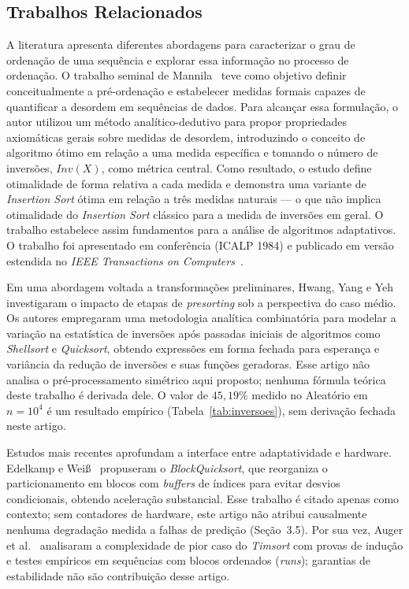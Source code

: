 \documentclass[portuguese]{sbc2025}%
\begin{document}
\subsection{Trabalhos Relacionados}

A literatura apresenta diferentes abordagens para caracterizar o grau de ordenação de uma sequência e explorar essa informação no processo de ordenação. O trabalho seminal de Mannila~\citep{mannila_measures_1984} teve como objetivo definir conceitualmente a pré-ordenação e estabelecer medidas formais capazes de quantificar a desordem em sequências de dados. Para alcançar essa formulação, o autor utilizou um método analítico-dedutivo para propor propriedades axiomáticas gerais sobre medidas de desordem, introduzindo o conceito de algoritmo ótimo em relação a uma medida específica e tomando o número de inversões, $Inv(X)$, como métrica central. Como resultado, o estudo define otimalidade de forma relativa a cada medida e demonstra uma variante de \emph{Insertion Sort} ótima em relação a três medidas naturais — o que não implica otimalidade do \emph{Insertion Sort} clássico para a medida de inversões em geral. O trabalho estabelece assim fundamentos para a análise de algoritmos adaptativos. O trabalho foi apresentado em conferência (ICALP 1984) e publicado em versão estendida no \emph{IEEE Transactions on Computers}~\citep{mannila_measures_1984}.

Em uma abordagem voltada a transformações preliminares, Hwang, Yang e Yeh~\citep{hwang_presorting_2000} investigaram o impacto de etapas de \emph{presorting} sob a perspectiva do caso médio. Os autores empregaram uma metodologia analítica combinatória para modelar a variação na estatística de inversões após passadas iniciais de algoritmos como \emph{Shellsort} e \emph{Quicksort}, obtendo expressões em forma fechada para esperança e variância da redução de inversões e suas funções geradoras. Esse artigo não analisa o pré-processamento simétrico aqui proposto; nenhuma fórmula teórica deste trabalho é derivada dele. O valor de $45{,}19\%$ medido no Aleatório em $n{=}10^4$ é um resultado empírico (Tabela~\ref{tab:inversoes}), sem derivação fechada neste artigo.

Estudos mais recentes aprofundam a interface entre adaptatividade e hardware. Edelkamp e Wei{\ss}~\citep{edelkamp_blockquicksort_2016} propuseram o \emph{BlockQuicksort}, que reorganiza o particionamento em blocos com \emph{buffers} de índices para evitar desvios condicionais, obtendo aceleração substancial. Esse trabalho é citado apenas como contexto; sem contadores de hardware, este artigo não atribui causalmente nenhuma degradação medida a falhas de predição (Seção~3.5). Por sua vez, Auger et al.~\citep{auger_timsort_2018} analisaram a complexidade de pior caso do \emph{Timsort} com provas de indução e testes empíricos em sequências com blocos ordenados (\emph{runs}); garantias de estabilidade não são contribuição desse artigo.
\end{document}
